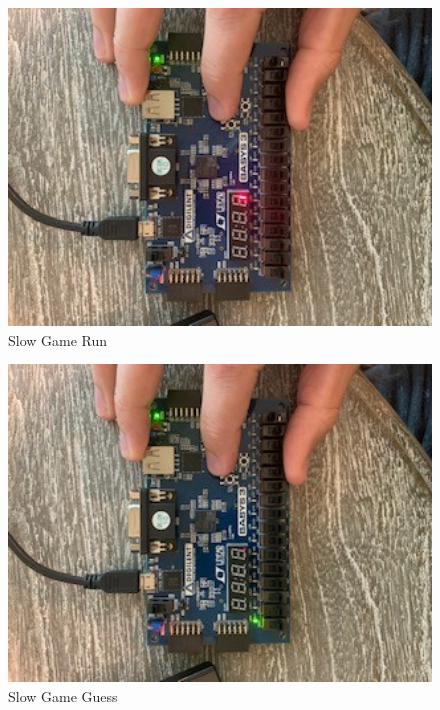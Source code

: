 \documentclass[11pt]{article}
\begin{document}
\begin{figure}[ht]\centering
	\includegraphics[width=1\textwidth,trim =0 0 0 0,clip,angle=90,origin=c]{slowgameRun}
	\caption{Slow Game Run}
	\label{fig:sim_with_table}
\end{figure}
\begin{figure}[ht]\centering
	\includegraphics[width=1\textwidth,trim =0 0 0 0,clip, angle=90,origin=c]{slowgameG}
	\caption{Slow Game Guess}
	\label{fig:sim_with_table}
\end{figure}
\end{document}
